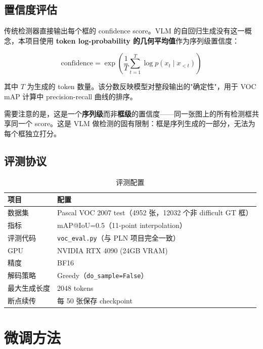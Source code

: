 \documentclass[12pt, a4paper]{article}
\begin{document}
\subsection{置信度评估}

传统检测器直接输出每个框的 confidence score。VLM 的自回归生成没有这一概念，本项目使用 \textbf{token log-probability 的几何平均值}作为序列级置信度：

\begin{equation}
    \text{confidence} = \exp\left(\frac{1}{T} \sum_{t=1}^{T} \log p(x_t \mid x_{<t})\right)
\end{equation}

其中 $T$ 为生成的 token 数量。该分数反映模型对整段输出的"确定性"，用于 VOC mAP 计算中 precision-recall 曲线的排序。

需要注意的是，这是一个\textbf{序列级}而非\textbf{框级}的置信度——同一张图上的所有检测框共享同一个 score。这是 VLM 做检测的固有限制：框是序列生成的一部分，无法为每个框独立打分。

\subsection{评测协议}

\begin{table}[H]
\centering
\caption{评测配置}
\label{tab:eval_config}
\begin{tabular}{@{}ll@{}}
\toprule
\textbf{项目} & \textbf{配置} \\
\midrule
数据集 & Pascal VOC 2007 test（4952 张，12032 个非 difficult GT 框） \\
指标 & mAP@IoU=0.5（11-point interpolation） \\
评测代码 & \texttt{voc\_eval.py}（与 PLN 项目完全一致） \\
GPU & NVIDIA RTX 4090 (24GB VRAM) \\
精度 & BF16 \\
解码策略 & Greedy（\texttt{do\_sample=False}） \\
最大生成长度 & 2048 tokens \\
断点续传 & 每 50 张保存 checkpoint \\
\bottomrule
\end{tabular}
\end{table}

\section{微调方法}
\end{document}
